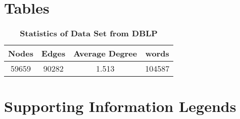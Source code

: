 \section*{Tables}
%
%
%

\begin{table}[!hbt]
\caption{\bf{Statistics of Data Set from DBLP}}
\label{tab:statdblp}
\centering
\begin{tabular}{|c|c|c|c|}\hline
Nodes&Edges&Average Degree&words\\\hline
59659 &90282 &1.513 &104587\\\hline
\end{tabular}
\end{table}

\section*{Supporting Information Legends}
%
%



